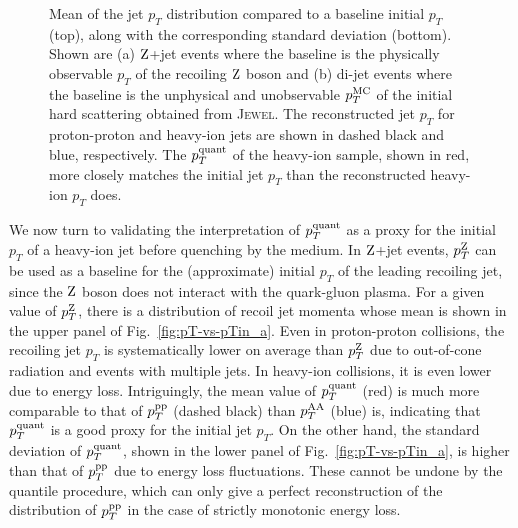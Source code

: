 \documentclass[aps,prl,twocolumn,preprintnumbers,superscriptaddress,showpacs,floatfix, nofootinbib]{revtex4-1}
\newcommand{\Z}{\rm Z}
\newcommand{\pTZ}{p_T^{\rm Z}}
\newcommand{\pTHI}{p_T^{\rm AA}}
\newcommand{\pTvac}{p_T^{\rm pp}}
\newcommand{\pTq}{p_T^{\rm quant}}
\newcommand{\Fig}[1]{Fig.~\ref{#1}}
\begin{document}
\begin{figure*}
\caption{
Mean of the jet $p_T$ distribution compared to a baseline initial $p_T$ (top), along with the corresponding standard deviation (bottom).
%
Shown are (a) $\Z$+jet events where the baseline is the physically observable $p_T$ of the recoiling $\Z$ boson and (b) di-jet events where the baseline is the unphysical and unobservable $p^{\rm MC}_T$ of the initial hard scattering obtained from \textsc{Jewel}.
%
The reconstructed jet $p_T$ for proton-proton and heavy-ion jets are shown in dashed black and blue, respectively.
%
The $\pTq$ of the heavy-ion sample, shown in red, more closely matches the initial jet $p_T$ than the reconstructed heavy-ion $p_T$ does.}
\label{fig:pT-vs-pTin}
\end{figure*}

We now turn to validating the interpretation of $\pTq$ as a proxy for the initial $p_T$ of a heavy-ion jet before quenching by the medium.
%
In $\Z$+jet events, $\pTZ$ can be used as a baseline for the (approximate) initial $p_T$ of the leading recoiling jet, since the $\Z$ boson does not interact with the quark-gluon plasma.
%
For a given value of $\pTZ$, there is a distribution of recoil jet momenta whose mean is shown in the upper panel of \Fig{fig:pT-vs-pTin_a}.
%
Even in proton-proton collisions, the recoiling jet $p_T$ is systematically lower on average than $\pTZ$ due to out-of-cone radiation and events with multiple jets.
%
In heavy-ion collisions, it is even lower due to energy loss.
%
Intriguingly, the mean value of $\pTq$ (red) is much more comparable to that of $\pTvac$ (dashed black) than $\pTHI$ (blue) is, indicating that $\pTq$ is a good proxy for the initial jet $p_T$. 
%
On the other hand, the standard deviation of $\pTq$, shown in the lower panel of \Fig{fig:pT-vs-pTin_a}, is higher than that of $\pTvac$ due to energy loss fluctuations.
%
These cannot be undone by the quantile procedure, which can only give a perfect reconstruction of the distribution of $\pTvac$ in the case of strictly monotonic energy loss.
\end{document}
